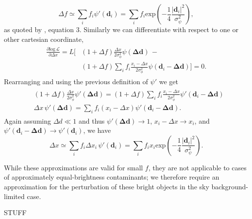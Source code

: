 \documentclass[fleqn,usenatbib]{mnras}
\begin{document}
\begin{equation}
    \Delta f \simeq \sum\limits_if_i\psi{'}(\mathbf{d}_i) = \sum\limits_if_i\mathrm{exp}\left(-\frac{1}{4}\frac{\lvert\mathbf{d}_i\lvert^2}{\sigma_\psi^2}\right),
\end{equation}
as quoted by \citet{2018MNRAS.476.4372}, equation 3. Similarly we can differentiate with respect to one or other cartesian coordinate,
\begin{align}
\begin{split}
    \frac{\partial\mathrm{log}\,\mathcal{L}}{\partial \Delta x} = L \bigg[&(1 + \Delta f)\frac{\Delta x}{2\sigma_\phi^2}\psi(\mathbf{\Delta d})\,-\\&(1 + \Delta f)\sum\limits_if_i\frac{x_i - \Delta x}{2\sigma_\phi^2}\psi(\mathbf{d}_i - \mathbf{\Delta d})\Bigg] = 0.
\end{split}
\end{align}
Rearranging and using the previous definition of $\psi{'}$ we get
\begin{align}
\begin{split}
    &(1 + \Delta f)\frac{\Delta x}{2\sigma_\phi^2}\psi{'}(\mathbf{\Delta d}) = (1 + \Delta f)\sum\limits_if_i\frac{x_i - \Delta x}{2\sigma_\phi^2}\psi{'}(\mathbf{d}_i - \mathbf{\Delta d})\\
    &\Delta x\,\psi{'}(\mathbf{\Delta d}) = \sum\limits_if_i(x_i - \Delta x)\psi{'}(\mathbf{d}_i - \mathbf{\Delta d}).
\label{eq:dxderiv}
\end{split}
\end{align}
Again assuming $\Delta d \ll 1$ and thus $\psi{'}(\mathbf{\Delta d}) \to 1$, $x_i - \Delta x \to x_i$, and $\psi{'}(\mathbf{d}_i - \mathbf{\Delta d}) \to \psi{'}(\mathbf{d}_i)$, we have
\begin{equation}
    \Delta x \simeq \sum\limits_if_i\Delta x_i\,\psi{'}(\mathbf{d}_i) = \sum\limits_if_ix_i\mathrm{exp}\left(-\frac{1}{4}\frac{\lvert\mathbf{d}_i\lvert^2}{\sigma_\psi^2}\right).
\end{equation}

While these approximations are valid for small $f$, they are not applicable to cases of approximately equal-brightness contaminants; we therefore require an approximation for the perturbation of these bright objects in the sky background-limited case.

STUFF
\end{document}
